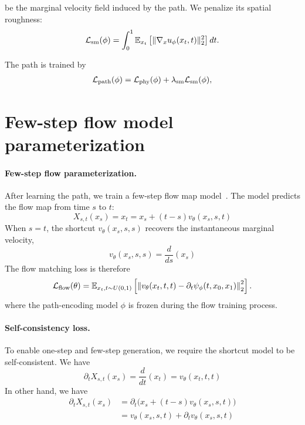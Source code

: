 \documentclass{article}
\begin{document}
be the marginal velocity field induced by the path. We penalize its spatial
roughness:
\begin{align}
    \mathcal L_{\rm sm}(\phi)
    =
    \int_0^1
    \mathbb E_{x_t}
    \left[
        \|\nabla_x u_\phi(x_t,t)\|_2^2
    \right]dt.
\end{align}
    

The path is trained by
\begin{align}
     \mathcal L_{\rm path}(\phi)
    =
    \mathcal L_{\rm phy}(\phi)
    +
    \lambda_{\rm sm}\mathcal L_{\rm sm}(\phi),
\end{align}
   

\section{Few-step flow model parameterization}

\paragraph{Few-step flow parameterization.}
After learning the path, we train a few-step flow map model~\citep{boffi2025flow}.  The model predicts the flow map from time \(s\) to \(t\):
\begin{equation}
    X_{s,t}(x_s) = x_t = x_s + (t-s) v_{\theta}(x_s, s, t)
\end{equation}
When \(s = t\), the shortcut $v_{\theta}(x_s, s,s)$ recovers the instantaneous marginal velocity,
\begin{equation}
 v_{\theta}(x_s, s,s) = \frac{d}{ds}(x_s)    
\end{equation}
The flow matching loss is therefore
\begin{equation}
    \mathcal L_{\rm flow}(\theta)
    =
    \mathbb E_{x_t, t \sim U(0,1)}
    \left[
        \left\|
        v_\theta(x_t,t,t)
        -
        \partial_t\psi_\phi(t,x_0,x_1)
        \right\|_2^2
    \right].
\end{equation}
where the path-encoding model $\phi$ is frozen during the flow training process. 
\paragraph{Self-consistency loss.}
To enable one-step and few-step generation, we require the shortcut model to be
self-consistent. We have 
\begin{equation}
    \partial_{t} X_{s,t} (x_s) = \frac{d}{dt}(x_t) = v_{\theta}(x_t, t,t)
\end{equation}
In other hand, we have 
\begin{align}
     \partial_{t} X_{s,t} (x_s) &= \partial_{t} \big( x_s + (t -s)v_\theta(x_s,s,t) \big) \\
     &= v_{\theta}(x_s, s,t) + \partial_t v_{\theta}(x_s, s,t)
\end{align}
\end{document}
